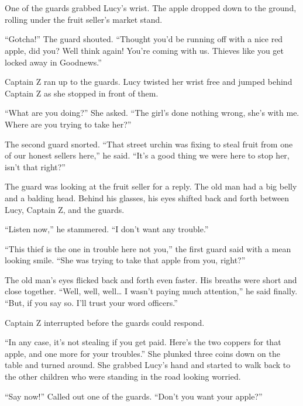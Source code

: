\documentclass[12pt]{extbook}
\begin{document}
  \section{}\label{section-31}
  
  One of the guards grabbed Lucy's wrist. The apple dropped down to the
  ground, rolling under the fruit seller's market stand.
  
  \enquote{Gotcha!} The guard shouted. \enquote{Thought you'd be running
  off with a nice red apple, did you? Well think again! You're coming with
  us. Thieves like you get locked away in Goodnews.}
  
  Captain Z ran up to the guards. Lucy twisted her wrist free and jumped
  behind Captain Z as she stopped in front of them.
  
  \enquote{What are you doing?} She asked. \enquote{The girl's done
  nothing wrong, she's with me. Where are you trying to take her?}
  
  The second guard snorted. \enquote{That street urchin was fixing to
  steal fruit from one of our honest sellers here,} he said. \enquote{It's
  a good thing we were here to stop her, isn't that right?}
  
  The guard was looking at the fruit seller for a reply. The old man had a
  big belly and a balding head. Behind his glasses, his eyes shifted back
  and forth between Lucy, Captain Z, and the guards.
  
  \enquote{Listen now,} he stammered. \enquote{I don't want any trouble.}
  
  \enquote{This thief is the one in trouble here not you,} the first guard
  said with a mean looking smile. \enquote{She was trying to take that
  apple from you, right?}
  
  The old man's eyes flicked back and forth even faster. His breaths were
  short and close together. \enquote{Well, well, well\ldots{} I wasn't
  paying much attention,} he said finally. \enquote{But, if you say so.
  I'll trust your word officers.}
  
  Captain Z interrupted before the guards could respond.
  
  \enquote{In any case, it's not stealing if you get paid. Here's the two
  coppers for that apple, and one more for your troubles.} She plunked
  three coins down on the table and turned around. She grabbed Lucy's hand
  and started to walk back to the other children who were standing in the
  road looking worried.
  
  \enquote{Say now!} Called out one of the guards. \enquote{Don't you want
  your apple?}
  
\end{document}
